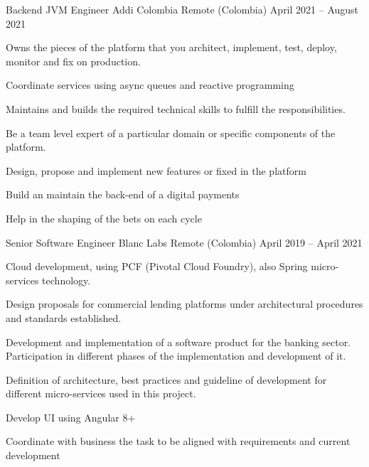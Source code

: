 \begin{cventries}
  \cventry
    {Backend JVM Engineer} %
    {Addi Colombia} %
    {Remote (Colombia)} %
    {April 2021 – August 2021} %
    {
      \begin{cvitems} %
        \item {Owns the pieces of the platform that you architect, implement, test, deploy, monitor and fix on production.}
        \item {Coordinate services using async queues and reactive programming}
        \item {Maintains and builds the required technical skills to fulfill the responsibilities.}
        \item {Be a team level expert of a particular domain or specific components of the platform.}
        \item {Design, propose and implement new features or fixed in the platform}
        \item {Build an maintain the back-end of a digital payments}
        \item {Help in the shaping of the bets on each cycle}
      \end{cvitems}
    }

  \cventry
    {Senior Software Engineer} %
    {Blanc Labs} %
    {Remote (Colombia)} %
    {April 2019 – April 2021} %
    {
      \begin{cvitems} %
        \item {Cloud development, using PCF (Pivotal Cloud Foundry), also Spring micro-services technology.}
        \item {Design proposals for commercial lending platforms under architectural procedures and standards established.}
        \item {Development and implementation of a software product for the banking sector. Participation in different phases of the implementation and development of it.}
        \item {Definition of architecture, best practices and guideline of development for different micro-services used in this project.}
        \item {Develop UI using Angular 8+}
        \item {Coordinate with business the task to be aligned with requirements and current development}
      \end{cvitems}
    }


\end{cventries}
